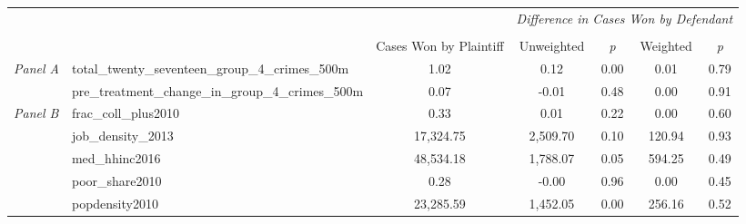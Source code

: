 \begin{tabular}{llccccc}
\toprule
 &  & \textit{} & \multicolumn{4}{c}{\textit{Difference in Cases Won by Defendant}} \\
\cline{4-7}
\\
 &  & Cases Won by Plaintiff & Unweighted & \emph{p} & Weighted & \emph{p} \\
\midrule
\multirow[c]{2}{3cm}{\textit{Panel A}} & total_twenty_seventeen_group_4_crimes_500m & 1.02 & 0.12 & 0.00 & 0.01 & 0.79 \\
 & pre_treatment_change_in_group_4_crimes_500m & 0.07 & -0.01 & 0.48 & 0.00 & 0.91 \\
\cline{1-7}
\multirow[c]{5}{3cm}{\textit{Panel B}} & frac_coll_plus2010 & 0.33 & 0.01 & 0.22 & 0.00 & 0.60 \\
 & job_density_2013 & 17,324.75 & 2,509.70 & 0.10 & 120.94 & 0.93 \\
 & med_hhinc2016 & 48,534.18 & 1,788.07 & 0.05 & 594.25 & 0.49 \\
 & poor_share2010 & 0.28 & -0.00 & 0.96 & 0.00 & 0.45 \\
 & popdensity2010 & 23,285.59 & 1,452.05 & 0.00 & 256.16 & 0.52 \\
\cline{1-7}
\bottomrule
\end{tabular}
